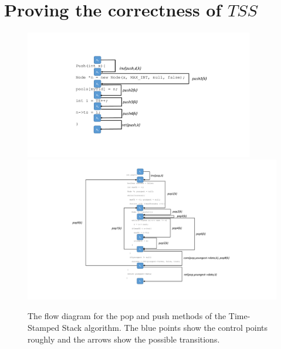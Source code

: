 \section{Proving the correctness of $TSS$}\label{app:tss}

%
\begin{figure}[t]
\centering
\includegraphics[width=10cm]{tssPushFlow.pdf}
\includegraphics[width=12cm]{tssPopFlow.pdf}
\vspace{-8mm}
\caption{The flow diagram for the pop and push methods of the Time-Stamped Stack algorithm. The blue points show the control points roughly and the arrows show the possible transitions.}
\label{fig:tssFlow}
\end{figure}



